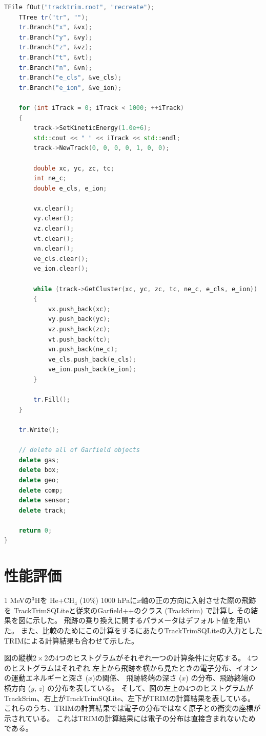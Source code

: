 \documentclass [11pt,a4paper,dvipdfmx] {jarticle}
\begin{document}
\begin{lstlisting}[caption=testTrackTrimSQLite.cpp (TrackTrimSQLiteの使用例。),language={C++},label=lstTrackTrimSQLite]
    TFile fOut("tracktrim.root", "recreate");
    TTree tr("tr", "");
    tr.Branch("x", &vx);
    tr.Branch("y", &vy);
    tr.Branch("z", &vz);
    tr.Branch("t", &vt);
    tr.Branch("n", &vn);
    tr.Branch("e_cls", &ve_cls);
    tr.Branch("e_ion", &ve_ion);

    for (int iTrack = 0; iTrack < 1000; ++iTrack)
    {
        track->SetKineticEnergy(1.0e+6);
        std::cout << " " << iTrack << std::endl;
        track->NewTrack(0, 0, 0, 0, 1, 0, 0);

        double xc, yc, zc, tc;
        int ne_c;
        double e_cls, e_ion;

        vx.clear();
        vy.clear();
        vz.clear();
        vt.clear();
        vn.clear();
        ve_cls.clear();
        ve_ion.clear();

        while (track->GetCluster(xc, yc, zc, tc, ne_c, e_cls, e_ion))
        {
            vx.push_back(xc);
            vy.push_back(yc);
            vz.push_back(zc);
            vt.push_back(tc);
            vn.push_back(ne_c);
            ve_cls.push_back(e_cls);
            ve_ion.push_back(e_ion);
        }

        tr.Fill();
    }

    tr.Write();

    // delete all of Garfield objects
    delete gas;
    delete box;
    delete geo;
    delete comp;
    delete sensor;
    delete track;

    return 0;
}
\end{lstlisting}
\section{性能評価}

1 MeVの$^3$Hを
He+CH$_4$ (10\%) 1000 hPaに$x$軸の正の方向に入射させた際の飛跡を
TrackTrimSQLiteと従来のGarfield++のクラス (TrackSrim) で計算し
その結果を図に示した。
飛跡の乗り換えに関するパラメータはデフォルト値を用いた。
また、比較のためにこの計算をするにあたりTrackTrimSQLiteの入力としたTRIMによる計算結果も合わせて示した。


図の縦横$2\times2$の4つのヒストグラムがそれぞれ一つの計算条件に対応する。
4つのヒストグラムはそれぞれ
左上から飛跡を横から見たときの電子分布、イオンの運動エネルギーと深さ ($x$)の関係、
飛跡終端の深さ ($x$) の分布、飛跡終端の横方向 ($y$, $z$) の分布を表している。
そして、図の左上の4つのヒストグラムがTrackSrim、右上がTrackTrimSQLite、左下がTRIMの計算結果を表している。
これらのうち、TRIMの計算結果では電子の分布ではなく原子との衝突の座標が示されている。
これはTRIMの計算結果には電子の分布は直接含まれないためである。
\end{document}
